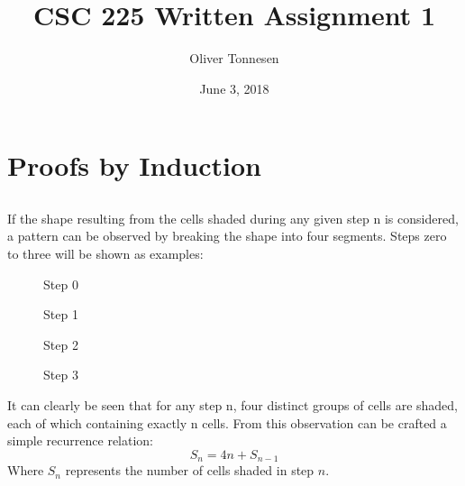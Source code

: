 \documentclass{article}
\title{\vspace{-3.5cm}CSC 225 Written Assignment 1}
\author{Oliver Tonnesen}
\date{June 3, 2018}
\begin{document}
\maketitle
\renewcommand{\thesubsection}{\thesection.\alph{subsection}}
\section{Proofs by Induction}
\subsection{}
	If the shape resulting from the cells shaded during any given step n is considered, a pattern can be observed by breaking the shape into four segments. Steps zero to three will be shown as examples:
	\begin{figure}[H]
		\centering
		\begin{minipage}{.45\textwidth}
			\centering
			
			\caption{Step 0}
		\end{minipage}\hfill
		\begin{minipage}{.45\textwidth}
			\centering
			
			\caption{Step 1}
		\end{minipage}\hfill
	\end{figure}
	\begin{figure}[H]
		\centering
		\begin{minipage}{.45\textwidth}
			\centering
			
			\caption{Step 2}
		\end{minipage}\hfill
		\begin{minipage}{.45\textwidth}
			\centering
			
			\caption{Step 3}
		\end{minipage}\hfill
	\end{figure}
	It can clearly be seen that for any step n, four distinct groups of cells are shaded, each of which containing exactly n cells.
	From this observation can be crafted a simple recurrence relation: 
	\[S_n = 4n + S_{n-1}\]
	Where $S_n$ represents the number of cells shaded in step $n$.
\end{document}
